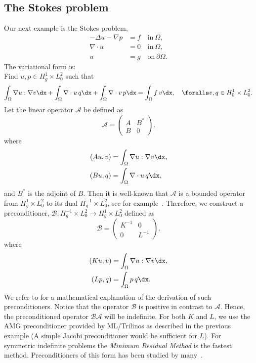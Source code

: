 \subsection{The Stokes problem}
Our next example is the Stokes problem,
\begin{align}
-\Delta u - \nabla p &= f \quad \mbox{in} \ \Omega, \\
\nabla \cdot u &= 0 \quad \mbox{in} \  \Omega, \\
             u &= g   \quad \mbox{on} \  \partial \Omega.
\end{align}
The variational form is: \\
Find $u,p \in H^1_g \times L_0^2$ such that
\[
\int_\Omega \nabla u : \nabla v \dx +
\int_\Omega \nabla \cdot u \, q \dx +
\int_\Omega \nabla \cdot v \, p \dx = \int_\Omega f\, v \dx   , \quad
\foralls v,q \in H^1_0 \times L_0^2.
\]
Let the linear operator $\mathcal{A}$ be defined as
\[
\mathcal{A}  =
\begin{pmatrix} A & B^* \\ B & 0 \end{pmatrix}.
\]
where
\begin{align}
(A u, v) &= \int_\Omega \nabla u : \nabla v \dx, \\
(B u, q) &= \int_\Omega \nabla \cdot u \, q \dx,
\end{align}
and $B^*$ is the adjoint of $B$.  Then it is well-known that
$\mathcal{A}$ is a bounded operator from $H^1_g \times L_0^2$ to its
dual $H_g^{-1} \times L_0^2$, see for
example~\citet{Brezzi1974,BrezziFortin1991}. Therefore, we construct a
preconditioner, $\mathcal{B}: H_g^{-1} \times L_0^2 \rightarrow
H^1_g \times L_0^2$ defined as
\[
\mathcal{B}
=
\begin{pmatrix} K^{-1} & 0 \\ 0 & L^{-1} \end{pmatrix}.
\]
where
\begin{align}
(K u, v) &= \int_\Omega \nabla u: \nabla v \dx, \\
(L p, q) &= \int_\Omega p \, q \dx .
\end{align}
We refer to \citet{MardalWinther11} for a mathematical explanation of
the derivation of such preconditioners.  Notice that the operator
$\mathcal{B}$ is positive in contrast to $\mathcal{A}$. Hence, the
preconditioned operator $\mathcal{B} \mathcal{A}$ will be
indefinite. For both $K$ and $L$, we use the AMG preconditioner
provided by ML/Trilinos as described in the previous example (A simple
Jacobi preconditioner would be sufficient for $L$).  For symmetric
indefinite problems the \emph{Minimum Residual Method} is the fastest
method. Preconditioners of this form has been studied by
many~\citep{ElmanSilvesterWathen2005,RustenWinther1992,SilvesterWathen1993,SilvesterWathen1994}.

